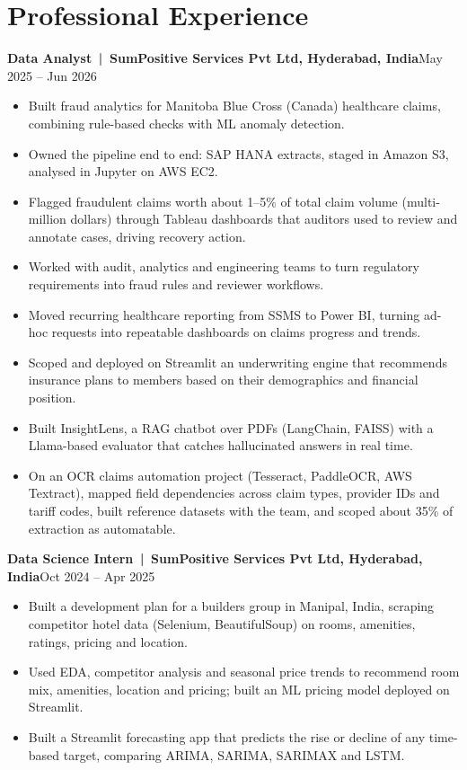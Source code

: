 \documentclass[10pt,a4paper]{article}
\newcommand{\entry}[2]{\textbf{#1}\hfill #2\\[-2pt]}
\begin{document}
\section{Professional Experience}

\entry{Data Analyst \,|\, SumPositive Services Pvt Ltd, Hyderabad, India}{May 2025 -- Jun 2026}
\begin{itemize}
  \item Built fraud analytics for Manitoba Blue Cross (Canada) healthcare claims, combining rule-based checks with ML anomaly detection.
  \item Owned the pipeline end to end: SAP HANA extracts, staged in Amazon S3, analysed in Jupyter on AWS EC2.
  \item Flagged fraudulent claims worth about 1--5\% of total claim volume (multi-million dollars) through Tableau dashboards that auditors used to review and annotate cases, driving recovery action.
  \item Worked with audit, analytics and engineering teams to turn regulatory requirements into fraud rules and reviewer workflows.
  \item Moved recurring healthcare reporting from SSMS to Power BI, turning ad-hoc requests into repeatable dashboards on claims progress and trends.
  \item Scoped and deployed on Streamlit an underwriting engine that recommends insurance plans to members based on their demographics and financial position.
  \item Built InsightLens, a RAG chatbot over PDFs (LangChain, FAISS) with a Llama-based evaluator that catches hallucinated answers in real time.
  \item On an OCR claims automation project (Tesseract, PaddleOCR, AWS Textract), mapped field dependencies across claim types, provider IDs and tariff codes, built reference datasets with the team, and scoped about 35\% of extraction as automatable.
\end{itemize}

\vspace{4pt}
\entry{Data Science Intern \,|\, SumPositive Services Pvt Ltd, Hyderabad, India}{Oct 2024 -- Apr 2025}
\begin{itemize}
  \item Built a development plan for a builders group in Manipal, India, scraping competitor hotel data (Selenium, BeautifulSoup) on rooms, amenities, ratings, pricing and location.
  \item Used EDA, competitor analysis and seasonal price trends to recommend room mix, amenities, location and pricing; built an ML pricing model deployed on Streamlit.
  \item Built a Streamlit forecasting app that predicts the rise or decline of any time-based target, comparing ARIMA, SARIMA, SARIMAX and LSTM.
\end{itemize}
\end{document}
